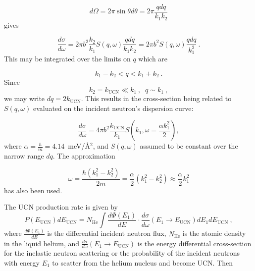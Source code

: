 \begin{equation}
d\Omega=2 \pi \sin \theta d \theta = 2 \pi \frac{q dq}{k_1 k_2}
\end{equation}
gives

\begin{equation}
 \frac{d\sigma}{d\omega}=2\pi b^2 \frac{k_2}{k_1}S(q,\omega)\frac{q
   dq}{k_1 k_2}=2\pi b^2 S(q,\omega)\frac{q dq}{k_1^2}~.
\end{equation}
This may be integrated over the limits on $q$ which are

\begin{equation}
  k_1-k_2 < q < k_1+k_2~.
\end{equation}
Since
\begin{equation}
k_2=k_{\text{UCN}} \ll k_1~, \; \; q\sim k_1~,
\end{equation}
we may write $dq=2k_{\text{UCN}}$. This results in the cross-section
being related to $S(q,\omega)$ evaluated on the incident neutron's
dispersion curve:

\begin{equation}
\frac{d\sigma}{d\omega}=4\pi b^2 \frac{k_{\text{UCN}}}{k_1}S \left(
k_1, \omega=\frac{\alpha k_1^2}{2} \right),
\end{equation}
where $\alpha=\frac{\hbar}{m}=4.14$~meV/\AA$^2$, and $S(q,\omega)$
assumed to be constant over the narrow range $dq$. The approximation

\begin{equation}
\omega=\frac{\hbar (k_1^2-k_2^2)}{2m}=\frac{\alpha}{2} (k_1^2 -
k_2^2)\approx \frac{\alpha}{2}k_1^2
\end{equation}
has also been used.

The UCN production rate is given by
\begin{equation}
\label{UCN_production}
P(E_{\text{UCN}}) dE_{\text{UCN}} = N_{\text{He}} \int \frac{d\Phi
  (E_1)}{dE}\cdot \frac{d \sigma}{d \omega}(E_1 \rightarrow
E_{\text{UCN}}) dE_1 dE_{\text{UCN}}~,
\end{equation}
where $\frac{d\Phi (E_1)}{dE}$ is the differential incident neutron
flux, $N_{\text{He}}$ is the atomic density in the liquid helium, and
$\frac{d \sigma}{d \omega}(E_1 \rightarrow E_{\text{UCN}})$ is the
energy differential cross-section for the inelastic neutron scattering
or the probability of the incident neutrons with energy $E_1$ to
scatter from the helium nucleus and become UCN.  Then

